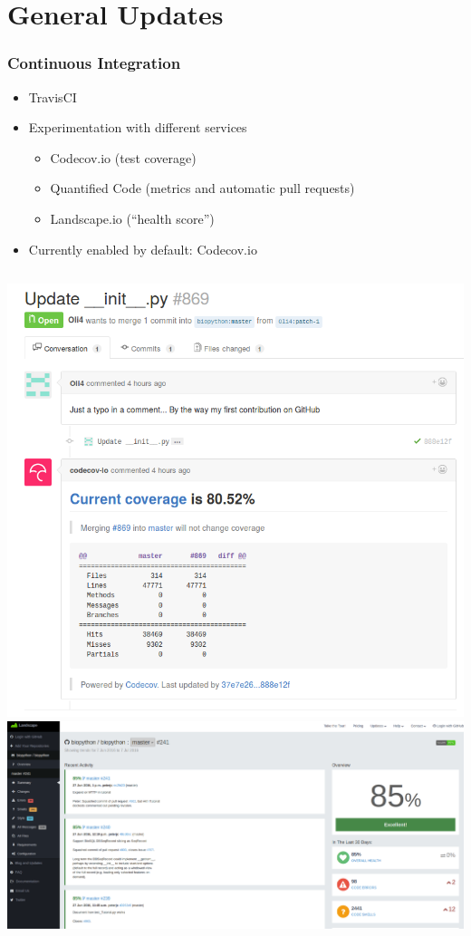 \documentclass[trans]{beamer}
\begin{document}
\section{General Updates}
\frame
{
  \frametitle{Continuous Integration}

  \begin{itemize}
  \item TravisCI
  \item Experimentation with different services
  \begin{itemize}
  \item Codecov.io (test coverage)
  \item Quantified Code (metrics and automatic pull requests)
  \item Landscape.io (``health score'')
  \end{itemize}
  \item Currently enabled by default: Codecov.io
  \end{itemize}

  \begin{columns}
  \includegraphics[width=1\textwidth]{bp-codecov.png}
  \includegraphics[width=1\textwidth]{bp-landscape.png}
  \end{columns}
}
\end{document}
